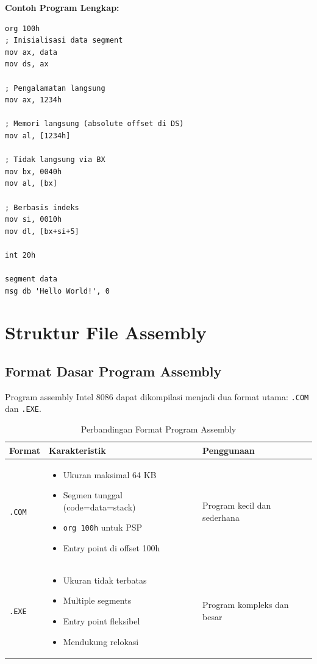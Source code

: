 \documentclass[../main.tex]{subfiles}
\begin{document}
\textbf{Contoh Program Lengkap:}
\begin{lstlisting}[language={[x86masm]Assembler}, caption=Program Lengkap dengan Berbagai Mode Pengalamatan, label=lst:complete-program]
org 100h
; Inisialisasi data segment
mov ax, data
mov ds, ax

; Pengalamatan langsung
mov ax, 1234h

; Memori langsung (absolute offset di DS)
mov al, [1234h]

; Tidak langsung via BX
mov bx, 0040h
mov al, [bx]

; Berbasis indeks
mov si, 0010h
mov dl, [bx+si+5]

int 20h

segment data
msg db 'Hello World!', 0
\end{lstlisting}

    \section{Struktur File Assembly}

        \subsection{Format Dasar Program Assembly}
            Program assembly Intel 8086 dapat dikompilasi menjadi dua format utama: \texttt{.COM} dan \texttt{.EXE}.

            \begin{table}[H]
\centering
\caption{Perbandingan Format Program Assembly}
\begin{tabular}{|p{1.8cm}|p{6.0cm}|p{6.5cm}|}
    \hline
    \textbf{Format} & \textbf{Karakteristik} & \textbf{Penggunaan} \\
    \hline
    \texttt{.COM} & \begin{itemize}
    \item Ukuran maksimal 64 KB
    \item Segmen tunggal (code=data=stack)
    \item \texttt{org 100h} untuk PSP
    \item Entry point di offset 100h
    \end{itemize} & Program kecil dan sederhana \\
    \hline
    \texttt{.EXE} & \begin{itemize}
    \item Ukuran tidak terbatas
    \item Multiple segments
    \item Entry point fleksibel
    \item Mendukung relokasi
    \end{itemize} & Program kompleks dan besar \\
    \hline
\end{tabular}
\label{tab:assembly-program-formats}
            \end{table}
\end{document}
